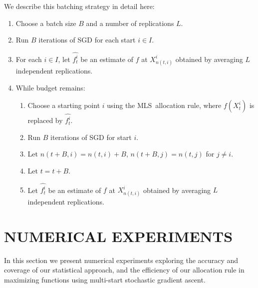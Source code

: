 \documentclass{wscpaperproc}
\theoremstyle{wsc}
\newcommand{\abbrv}{MLS}
\newcommand{\stedit}[1]{{\color{red} #1}}
\begin{document}

We describe this batching strategy in detail here: 
\begin{enumerate}
\item Choose a batch size $B$ and a number of replications $L$. 
\item Run $B$ iterations of SGD for each start $i\in I$.
\item For each $i\in I$, let $\hat{f_t^i}$ be an estimate of $f$ at $X_{n(t,i)}^{i}$ obtained by averaging $L$ independent replications.
\item While budget remains:
\begin{enumerate}
\item Choose a starting point $i$ using the  \abbrv\ allocation rule, where $f(X_t^i)$ is replaced by $\hat{f_t^i}$.
\item Run $B$ iterations of SGD for start $i$.
\item Let $n(t+B,i) = n(t,i)+B$, $n(t+B,j)=n(t,j)$ for $j\ne i$.
\item Let $t = t+B$.
\item Let $\hat{f_t^i}$ be an estimate of $f$ at $X_{n(t,i)}^{i}$ obtained by averaging $L$ independent replications.
\end{enumerate}
\end{enumerate}


\section{NUMERICAL EXPERIMENTS}
\label{experiments}

In this section we present numerical experiments exploring the accuracy and coverage of our statistical approach, and the efficiency of our allocation rule in maximizing functions using multi-start stochastic gradient ascent.
\end{document}
